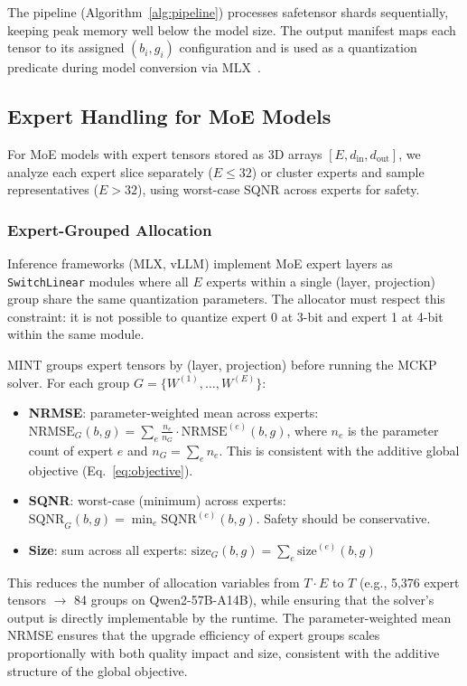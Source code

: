 \documentclass{article}
\begin{document}
The pipeline (Algorithm~\ref{alg:pipeline}) processes safetensor shards sequentially, keeping peak memory well below the model size. The output manifest maps each tensor to its assigned $(b_i, g_i)$ configuration and is used as a quantization predicate during model conversion via MLX~\cite{mlx2023}.

\subsection{Expert Handling for MoE Models}

For MoE models with expert tensors stored as 3D arrays $[E, d_{\text{in}}, d_{\text{out}}]$, we analyze each expert slice separately ($E \leq 32$) or cluster experts and sample representatives ($E > 32$), using worst-case SQNR across experts for safety.

\subsubsection{Expert-Grouped Allocation}

Inference frameworks (MLX, vLLM) implement MoE expert layers as \texttt{SwitchLinear} modules where all $E$ experts within a single (layer, projection) group share the same quantization parameters. The allocator must respect this constraint: it is not possible to quantize expert 0 at 3-bit and expert 1 at 4-bit within the same module.

MINT groups expert tensors by (layer, projection) before running the MCKP solver. For each group $G = \{W^{(1)}, \ldots, W^{(E)}\}$:
\begin{itemize}
    \item \textbf{NRMSE}: parameter-weighted mean across experts: $\text{NRMSE}_G(b,g) = \sum_e \frac{n_e}{n_G} \cdot \text{NRMSE}^{(e)}(b,g)$, where $n_e$ is the parameter count of expert $e$ and $n_G = \sum_e n_e$. This is consistent with the additive global objective (Eq.~\ref{eq:objective}).
    \item \textbf{SQNR}: worst-case (minimum) across experts: $\text{SQNR}_G(b,g) = \min_e \text{SQNR}^{(e)}(b,g)$. Safety should be conservative.
    \item \textbf{Size}: sum across all experts: $\text{size}_G(b,g) = \sum_e \text{size}^{(e)}(b,g)$
\end{itemize}
This reduces the number of allocation variables from $T \cdot E$ to $T$ (e.g., 5{,}376 expert tensors $\rightarrow$ 84 groups on Qwen2-57B-A14B), while ensuring that the solver's output is directly implementable by the runtime. The parameter-weighted mean NRMSE ensures that the upgrade efficiency of expert groups scales proportionally with both quality impact and size, consistent with the additive structure of the global objective.
\end{document}
